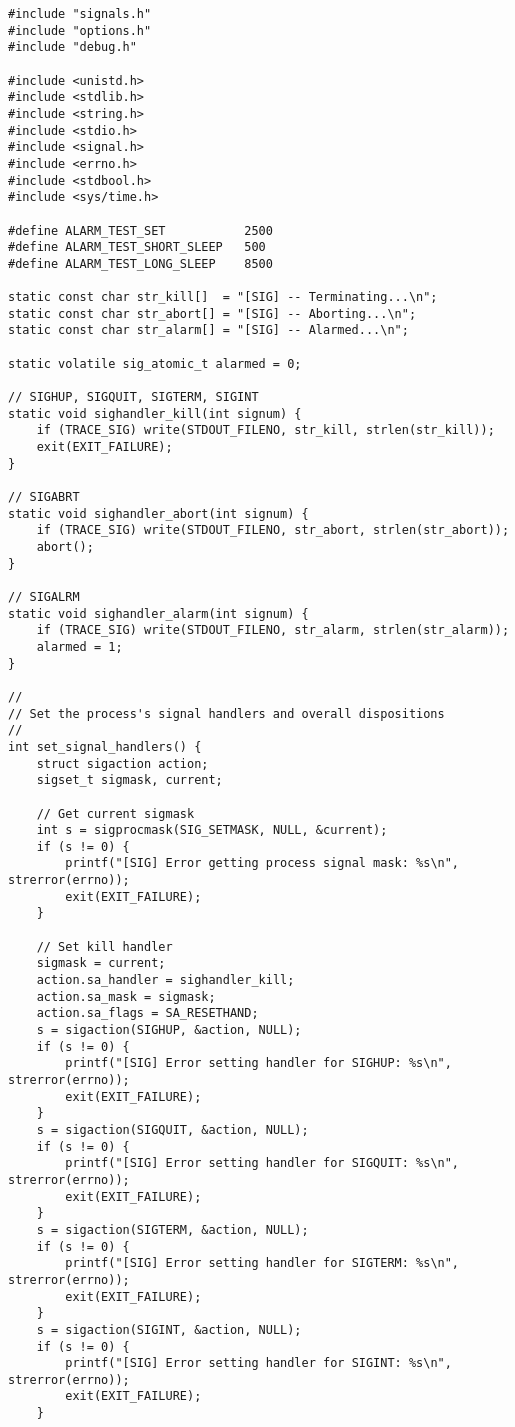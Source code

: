 \documentclass[subfiles]{main.tex}
\begin{document}
\begin{lstlisting}[style=rcom]
#include "signals.h"
#include "options.h"
#include "debug.h"

#include <unistd.h>
#include <stdlib.h>
#include <string.h>
#include <stdio.h>
#include <signal.h>
#include <errno.h>
#include <stdbool.h>
#include <sys/time.h>

#define ALARM_TEST_SET           2500
#define ALARM_TEST_SHORT_SLEEP   500
#define ALARM_TEST_LONG_SLEEP    8500

static const char str_kill[]  = "[SIG] -- Terminating...\n";
static const char str_abort[] = "[SIG] -- Aborting...\n";
static const char str_alarm[] = "[SIG] -- Alarmed...\n";

static volatile sig_atomic_t alarmed = 0;

// SIGHUP, SIGQUIT, SIGTERM, SIGINT
static void sighandler_kill(int signum) {
	if (TRACE_SIG) write(STDOUT_FILENO, str_kill, strlen(str_kill));
	exit(EXIT_FAILURE);
}

// SIGABRT
static void sighandler_abort(int signum) {
	if (TRACE_SIG) write(STDOUT_FILENO, str_abort, strlen(str_abort));
	abort();
}

// SIGALRM
static void sighandler_alarm(int signum) {
	if (TRACE_SIG) write(STDOUT_FILENO, str_alarm, strlen(str_alarm));
	alarmed = 1;
}

//
// Set the process's signal handlers and overall dispositions
//
int set_signal_handlers() {
	struct sigaction action;
	sigset_t sigmask, current;
	
	// Get current sigmask
	int s = sigprocmask(SIG_SETMASK, NULL, &current);
	if (s != 0) {
		printf("[SIG] Error getting process signal mask: %s\n", strerror(errno));
		exit(EXIT_FAILURE);
	}
	
	// Set kill handler
	sigmask = current;
	action.sa_handler = sighandler_kill;
	action.sa_mask = sigmask;
	action.sa_flags = SA_RESETHAND;
	s = sigaction(SIGHUP, &action, NULL);
	if (s != 0) {
		printf("[SIG] Error setting handler for SIGHUP: %s\n", strerror(errno));
		exit(EXIT_FAILURE);
	}
	s = sigaction(SIGQUIT, &action, NULL);
	if (s != 0) {
		printf("[SIG] Error setting handler for SIGQUIT: %s\n", strerror(errno));
		exit(EXIT_FAILURE);
	}
	s = sigaction(SIGTERM, &action, NULL);
	if (s != 0) {
		printf("[SIG] Error setting handler for SIGTERM: %s\n", strerror(errno));
		exit(EXIT_FAILURE);
	}
	s = sigaction(SIGINT, &action, NULL);
	if (s != 0) {
		printf("[SIG] Error setting handler for SIGINT: %s\n", strerror(errno));
		exit(EXIT_FAILURE);
	}
	

\end{lstlisting}
\end{document}
